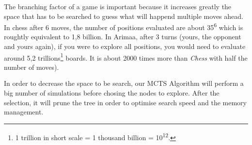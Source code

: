 The branching factor of a game is important because it increases greatly the space that has to be searched to guess what will happend multiple moves ahead. In chess after 6 moves, the number of positions evaluated are about 35\textsuperscript{6} which is roughtly equivalent to 1,8 billion. In Arimaa, after 3 turns (yours, the opponent and yours again), if you were to explore all positions, you would need to evaluate around 5,2 trillions\footnote{1 trillion in short scale = 1 thousand billion = 10\textsuperscript{12}.} boards. It is about 2000 times more than \textit{Chess} with half the number of moves).

In order to decrease the space to be search, our MCTS Algorithm will perform a big number of simulations before chosing the nodes to explore. After the selection, it will prune the tree in order to optimise search speed and the memory management.
